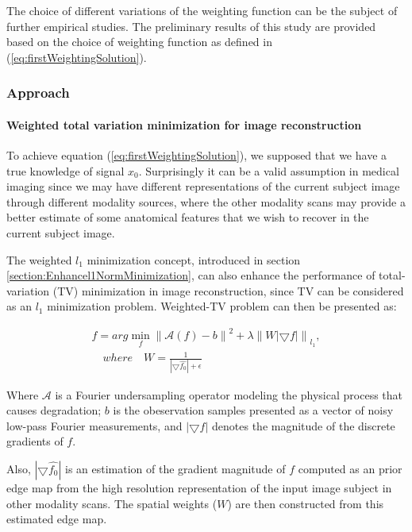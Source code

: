 The choice of different variations of the weighting function can be the subject of further empirical studies. The preliminary results of this study are provided based on the choice of weighting function as defined in (\ref{eq:firstWeightingSolution}).
\newline

\subsubsection{Approach}

\paragraph{Weighted total variation minimization for image reconstruction}

To achieve equation (\ref{eq:firstWeightingSolution}), we supposed that we have a true knowledge of signal $x_{0}$. Surprisingly it can be a valid assumption in medical imaging since we may have different representations of the current subject image through different modality sources, where the other modality scans may provide a better estimate of some anatomical features that we wish to recover in the current subject image.

The weighted $l_{1}$ minimization concept, introduced in section \ref{section:Enhancel1NormMinimization}, can also enhance the performance of total-variation (TV) minimization in image reconstruction, since TV can be considered as an $l_{1}$ minimization problem. Weighted-TV problem can then be presented as:

\begin{equation}
\label{eq:weightedregularization}
\begin{gathered}
\widehat{f} = arg\min_{f}\left\|\mathcal{A}(f)-b\right\|^{2} + \lambda \left \| W \left | \bigtriangledown f \right | \right \|_{l_{1}}, \\
\quad where \quad W = \frac{1}{\left | \bigtriangledown \widehat{f_{0}} \right |+\epsilon }
\end{gathered}
\end{equation}

Where $\mathcal{A}$ is a Fourier undersampling operator modeling the physical process that causes degradation; $b$ is the obeservation samples presented as a vector of noisy low-pass Fourier measurements, and $\left | \bigtriangledown f \right |$ denotes the magnitude of the discrete gradients of $f$.

Also, $\left | \bigtriangledown \widehat{f_{0}} \right |$ is an estimation of the gradient magnitude of $f$ computed as an prior edge map from the high resolution representation of the input image subject in other modality scans. 
The spatial weights ($W$) are then constructed from this estimated edge map.

